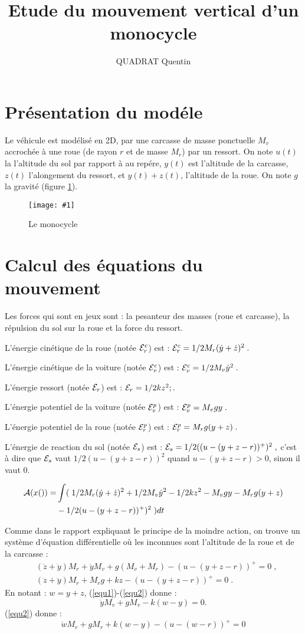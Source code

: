\documentclass[a4paper,11pt]{amsart}
\title{Etude du mouvement vertical d'un monocycle}
\author{QUADRAT Quentin}
\newcommand{\dessin}[4]{
\begin{figure}[htb]
\centering
\texttt{[image: \#1]}
\caption{#3}
\label{#4}
\end{figure}}
\begin{document}
\maketitle

\section{Pr\'esentation du mod\'ele}
Le v\'ehicule est mod\'elis\'e en 2D, par une carcasse de masse
ponctuelle $M_v$ accroch\'ee \`a une roue (de rayon $r$ et de masse
$M_r$) par un ressort. On note $u(t)$ la l'altitude du sol par rapport
\`a au rep\'ere, $y(t)$ est l'altitude de la carcasse, $z(t)$
l'alongement du ressort, et $y(t)+z(t)$, l'altitude de la roue. On
note $g$ la gravit\'e (figure \ref{dyna}).

\dessin{dynavoit.epsf}{0.6}{Le monocycle}{dyna}

\section{Calcul des \'equations du mouvement}
Les forces qui sont en jeux sont : la pesanteur des masses (roue et
carcasse), la r\'epulsion du sol sur la roue et la force du ressort.

L'\'energie cin\'etique de la roue (not\'ee ${\mathcal E}_r^c$) est :
${\mathcal E}_r^c = 1/2M_r(\dot{y}+\dot{z})^2\;.$

L'\'energie cin\'etique de la voiture (not\'ee ${\mathcal E}_v^c$) est :
${\mathcal E}_v^c = 1/2M_v\dot{y}^2\;.$

L'\'energie ressort (not\'ee ${\mathcal E}_r$) est :
${\mathcal E}_r = 1/2kz^2;.$

L'\'energie potentiel de la voiture (not\'ee ${\mathcal E}_v^p$) est :
${\mathcal E}_v^p = M_vgy\;.$

L'\'energie potentiel de la roue (not\'ee ${\mathcal E}_r^p$) est :
${\mathcal E}_r^p = M_rg(y+z)\;.$

L'\'energie de reaction du sol (not\'ee ${\mathcal E}_s$) est : ${\mathcal E}_s =
1/2((u-(y+z-r))^+)^2\;,$ c'est \`a dire que ${\mathcal E}_s$ vaut $1/2(u-(y+z-r))^2$
quand $u-(y+z-r) > 0$, sinon il vaut $0$.

\begin{align*}
{\mathcal A}(x()) =& \int (\;1/2M_r(\dot{y}+\dot{z})^2 + 1/2M_v\dot{y}^2 -1/2kz^2 -M_vgy - M_rg(y+z)\\
&- 1/2(u-(y+z-r))^+)^2\;)dt\;
\end{align*}

Comme dans le rapport expliquant le principe de la moindre action, on
trouve un syst\`eme d'\'equation diff\'erentielle o\`u les inconnues
sont l'altitude de la roue et de la carcasse :
\begin{align}
  &(\ddot{z}+\ddot{y})M_r+\ddot{y}M_v + g(M_v+M_r) - (u-(y+z-r))^+ = 0\;,\label{equ1}\\
  &(\ddot{z}+\ddot{y})M_r+M_rg+kz-(u-(y+z-r))^+ = 0\;.\label{equ2}
\end{align}
En notant : $w=y+z$, (\ref{equ1})-(\ref{equ2}) donne :
$$\ddot{y}M_v+gM_v-k(w-y)=0.$$
(\ref{equ2}) donne :
$$\ddot{w}M_r+gM_r+k(w-y)-(u-(w-r))^+ = 0$$
\end{document}
